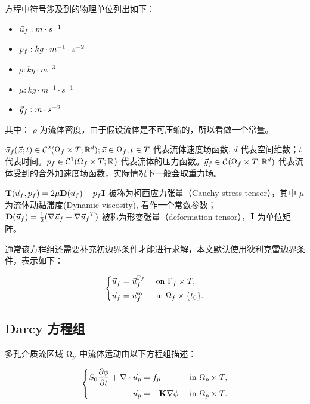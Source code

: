 方程中符号涉及到的物理单位列出如下：
\begin{itemize}
\item $\Uf : m \cdot s^{-1}$
\item $\pf : kg \cdot m^{-1} \cdot s^{-2}$
\item $\rho : kg \cdot m^{-3}$
\item $\mu : kg \cdot m^{-1} \cdot s^{-1}$
\item $\gf : m \cdot s^{-2}$
\end{itemize}

其中：
$\rho$ 为流体密度，由于假设流体是不可压缩的，所以看做一个常量。

$ \Uf(\vec{x};t) \in \C[2](\Df; \R[d]); \vec{x} \in \Of, t \in T$ 代表流体速度场函数, $d$ 代表空间维数；$t$ 代表时间。$ \pf \in \C[1](\Df; \R) $ 代表流体的压力函数。$ \gf \in \C(\Df; \R[d])$ 代表流体受到的合外加速度场函数，实际情况下一般会取重力场。

$\opTf = 2 \mu \opDf - \pf \matfmt{I}$ 被称为柯西应力张量（Cauchy stress tensor），其中 $\mu$ 为流体动黏滞度(Dynamic viscosity), 看作一个常数参数； $\opDf = \frac{1}{2}(\gradOp \Uf + {\gradOp \Uf}^T)$ 被称为形变张量（deformation tensor），$\matfmt{I}$ 为单位矩阵。

通常该方程组还需要补充初边界条件才能进行求解，本文默认使用狄利克雷边界条件，表示如下：

\begin{equation}
\left\{\begin{aligned} 
    \Uf &= \Uf^{\Bf} & & \text{ on } \BDf,\\
    \Uf &= \Uf^{t_0} & & \text{ in } \IDf.
\end{aligned}\right.
\end{equation}

\subsection{Darcy 方程组}

多孔介质流区域 $\Op$ 中流体运动由以下方程组描述：

\begin{equation}\label{eq:Darcy}
\left\{
    \begin{aligned}
        S_0 \toD{\pp}{t}+\gradOp \cdot \Up &=\fp & & \text { in } \Dp, \\
        \Up &= -\matfmt{K} \gradOp \pp & & \text { in } \Dp.
    \end{aligned}
\right.
\end{equation}

